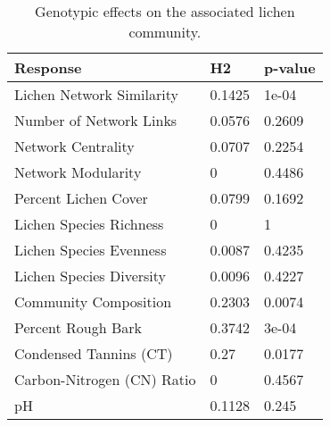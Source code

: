 \begin{table}[ht]
\centering
\begin{tabular}{lll}
  \hline
Response & H2 & p-value \\ 
  \hline
Lichen Network Similarity & 0.1425 & 1e-04 \\ 
  Number of Network Links & 0.0576 & 0.2609 \\ 
  Network Centrality & 0.0707 & 0.2254 \\ 
  Network Modularity & 0 & 0.4486 \\ 
  Percent Lichen Cover & 0.0799 & 0.1692 \\ 
  Lichen Species Richness & 0 & 1 \\ 
  Lichen Species Evenness & 0.0087 & 0.4235 \\ 
  Lichen Species Diversity & 0.0096 & 0.4227 \\ 
  Community Composition & 0.2303 & 0.0074 \\ 
  Percent Rough Bark & 0.3742 & 3e-04 \\ 
  Condensed Tannins (CT) & 0.27 & 0.0177 \\ 
  Carbon-Nitrogen (CN) Ratio & 0 & 0.4567 \\ 
  pH & 0.1128 & 0.245 \\ 
   \hline
\end{tabular}
\caption{Genotypic effects on the associated lichen community.} 
\label{tab:h2_table}
\end{table}

